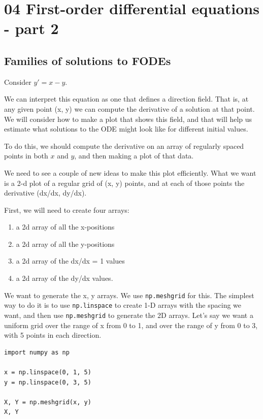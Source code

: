 \documentclass[11pt]{article}
\begin{document}
\section{04 First-order differential equations - part 2}
\label{sec:org1940843}

\subsection{Families of solutions to FODEs}
\label{sec:orgdaaeb9a}

Consider \(y' = x - y\).

We can interpret this equation as one that defines a direction field. That is, at any given point (x, y) we can compute the derivative of a solution at that point. We will consider how to make a plot that shows this field, and that will help us estimate what solutions to the ODE might look like for different initial values.

To do this, we should compute the derivative on an array of regularly spaced points in both \(x\) and \(y\), and then making a plot of that data.

We need to see a couple of new ideas to make this plot efficiently. What we want is a 2-d plot of a regular grid of (x, y) points, and at each of those points the derivative (dx/dx, dy/dx).

First, we will need to create four arrays:
\begin{enumerate}
\item a 2d array of all the x-positions
\item a 2d array of all the y-positions
\item a 2d array of the dx/dx = 1 values
\item a 2d array of the dy/dx values.
\end{enumerate}

We want to generate the x, y arrays. We use \texttt{np.meshgrid} for this. The simplest way to do it is to use \texttt{np.linspace} to create 1-D arrays with the spacing we want, and then use \texttt{np.meshgrid} to generate the 2D arrays. Let's say we want a uniform grid over the range of x from 0 to 1, and over the range of y from 0 to 3, with 5 points in each direction.

\begin{verbatim}
import numpy as np

x = np.linspace(0, 1, 5)
y = np.linspace(0, 3, 5)

X, Y = np.meshgrid(x, y)
X, Y
\end{verbatim}
\end{document}
